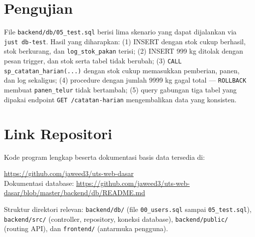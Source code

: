 \documentclass[12pt,a4paper]{article}
\begin{document}
\section{Pengujian}

File \texttt{backend/db/05\_test.sql} berisi lima skenario yang dapat dijalankan via \texttt{just db-test}. Hasil yang diharapkan: (1) INSERT dengan stok cukup berhasil, stok berkurang, dan \texttt{log\_stok\_pakan} terisi; (2) INSERT 999 kg ditolak dengan pesan trigger, dan stok serta tabel tidak berubah; (3) \texttt{CALL sp\_catatan\_harian(...)} dengan stok cukup memasukkan pemberian, panen, dan log sekaligus; (4) procedure dengan jumlah 9999 kg gagal total --- \texttt{ROLLBACK} membuat \texttt{panen\_telur} tidak bertambah; (5) query gabungan tiga tabel yang dipakai endpoint \texttt{GET /catatan-harian} mengembalikan data yang konsisten.

\section{Link Repositori}

Kode program lengkap beserta dokumentasi basis data tersedia di:

\begin{center}
\url{https://github.com/jaweed3/uts-web-dasar} \\[0.3em]
Dokumentasi database: \url{https://github.com/jaweed3/uts-web-dasar/blob/master/backend/db/README.md}
\end{center}

Struktur direktori relevan: \texttt{backend/db/} (file \texttt{00\_users.sql} sampai \texttt{05\_test.sql}), \texttt{backend/src/} (controller, repository, koneksi database), \texttt{backend/public/} (routing API), dan \texttt{frontend/} (antarmuka pengguna).
\end{document}
